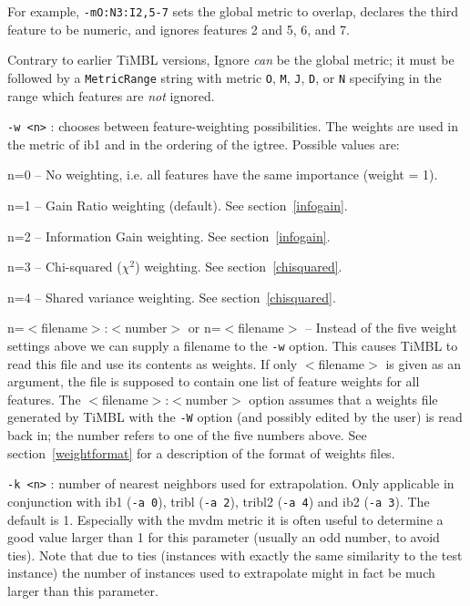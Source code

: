 \documentclass{report}
\begin{document}
\begin{description}
For example, {\tt -mO:N3:I2,5-7} sets the global metric to overlap,
declares the third feature to be numeric, and ignores features 2 and
5, 6, and 7.

Contrary to earlier TiMBL versions, Ignore {\em can}\/ be the global
metric; it must be followed by a {\tt MetricRange} string with metric
{\tt O}, {\tt M}, {\tt J}, {\tt D}, or {\tt N} specifying in the range which
features are {\em not}\/ ignored.

\item {\tt -w <n>} : chooses between feature-weighting possibilities.
The weights are used in the metric of {\sc ib1} and in the ordering of the
{\sc igtree}. Possible values are:

	\begin{description}
	\item n=0 -- No weighting, i.e. all features have the same
	importance (weight = 1).
	\item n=1 -- Gain Ratio weighting (default). See section~\ref{infogain}.
	\item n=2 -- Information Gain weighting. See section~\ref{infogain}.
	\item n=3 -- Chi-squared ($\chi^2$) weighting. See section~\ref{chisquared}.
	\item n=4 -- Shared variance weighting. See section~\ref{chisquared}.
	\item n=$<$filename$>$:$<$number$>$ or n=$<$filename$>$ --
          Instead of the five weight settings above we can supply a
          filename to the {\tt -w} option. This causes TiMBL to read
          this file and use its contents as weights. If only
          $<$filename$>$ is given as an argument, the file is supposed
          to contain one list of feature weights for all features. The
          $<$filename$>$:$<$number$>$ option assumes that a weights
          file generated by TiMBL with the {\tt -W} option (and
          possibly edited by the user) is read back in; the number
          refers to one of the five numbers above. See
          section~\ref{weightformat} for a description of the format
          of weights files.
	\end{description}

\item {\tt -k <n>} : number of nearest neighbors used for
        extrapolation. Only applicable in conjunction with {\sc ib1}
        ({\tt -a 0}), {\sc tribl} ({\tt -a 2}), {\sc tribl2} ({\tt -a
          4}) and {\sc ib2} ({\tt -a 3}). The default is 1. Especially
        with the {\sc mvdm} metric it is often useful to determine a
        good value larger than 1 for this parameter (usually an odd
        number, to avoid ties). Note that due to ties (instances with
        exactly the same similarity to the test instance) the number
        of instances used to extrapolate might in fact be much larger
        than this parameter.


\end{description}
\end{document}
